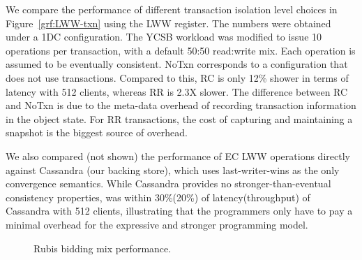 We compare the performance of different transaction isolation level choices in
Figure~\ref{grf:LWW-txn} using the LWW register. The numbers were obtained
under a 1DC configuration. The YCSB workload was modified to issue 10
operations per transaction, with a default 50:50 read:write mix. Each operation
is assumed to be eventually consistent. NoTxn corresponds to a configuration
that does not use transactions. Compared to this, RC is only 12\% shower in
terms of latency with 512 clients, whereas RR is 2.3X slower. The difference
between RC and NoTxn is due to the meta-data overhead of recording transaction
information in the object state. For RR transactions, the cost of capturing and
maintaining a snapshot is the biggest source of overhead.

We also compared (not shown) the performance of EC LWW operations directly
against Cassandra (our backing store), which uses last-writer-wins as the only
convergence semantics. While Cassandra provides no stronger-than-eventual
consistency properties, \name was within 30\%(20\%) of latency(throughput) of
Cassandra with 512 clients, illustrating that the programmers only have to pay
a minimal overhead for the expressive and stronger \name programming model.

\begin{figure}
  \centering
	\caption{Rubis bidding mix performance.}
  \label{grf:rubis}
\end{figure}

